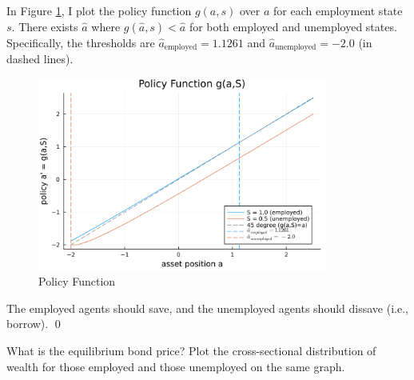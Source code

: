 \begin{solution} In Figure \ref{fig:policy}, I plot the policy function $g(a,s)$ over $a$ for each employment state $s$.
    There exists $\hat{a}$ where $g(\hat{a},s) < \hat{a}$ for both employed and unemployed states.
    Specifically, the thresholds are $\hat{a}_{\text{employed}} = 1.1261$ and $\hat{a}_{\text{unemployed}} = -2.0$ (in dashed lines).
    \begin{figure}[H]
        \centering
        \includegraphics[width=0.85\textwidth, angle=0]
        {2 Policy_Functions.png}
        \caption{Policy Function}
        \label{fig:policy}
    \end{figure}
    \begin{remark}
        The employed agents should save, and the unemployed agents should dissave (i.e., borrow). \qed
    \end{remark}
\end{solution}

\newpage
\begin{framedexercise} What is the equilibrium bond price?
    Plot the cross-sectional distribution of wealth for
    those employed and those unemployed on the same graph.
\end{framedexercise}

